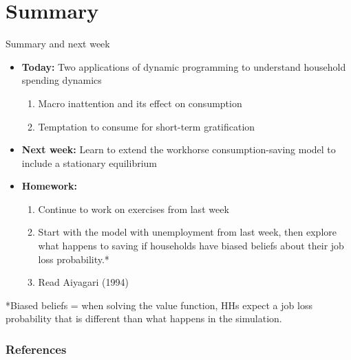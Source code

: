\documentclass[10pt,english,t,10pt]{beamer}
\begin{document}
\section{Summary}
\begin{frame}{Summary and next week}
\begin{itemize}
	\item <+->\textbf{Today: }Two applications of dynamic programming to
	understand household spending dynamics
	\begin{enumerate}
		\item Macro inattention and its effect on consumption
		\item Temptation to consume for short-term gratification\vfill
	\end{enumerate}
	\item <+->\textbf{Next week: } Learn to extend the workhorse consumption-saving model to include a stationary equilibrium 
	\item <+->\textbf{Homework:}
	\begin{enumerate}
		\item Continue to work on exercises from last week
		\item Start with the model with unemployment from last week, then explore what happens to saving if households have biased beliefs about their job loss probability.*
		\item Read Aiyagari (1994)
	\end{enumerate}
\end{itemize}
\pause
*Biased beliefs = when solving the value function, HHs expect a job loss probability that is different than what happens in the simulation.
\end{frame}
%


\tiny

\beamerdefaultoverlayspecification{<*>}

\begin{frame}[t,allowframebreaks]
\frametitle{References}

%



\end{frame}

\normalsize
\end{document}
